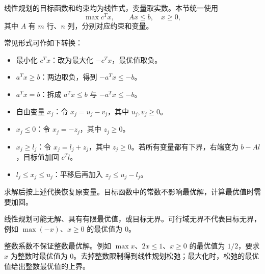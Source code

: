 线性规划的目标函数和约束均为线性式，变量取实数。本节统一使用
\[
\max c^Tx,\qquad Ax\le b,\quad x\ge0,
\]
其中 $A$ 有 $m$ 行、$n$ 列，分别对应约束和变量。

常见形式可作如下转换：
\begin{itemize}[leftmargin=*,nosep]
\item 最小化 $c^Tx$：改为最大化 $-c^Tx$，最优值取负。
\item $a^Tx\ge b$：两边取负，得到 $-a^Tx\le-b$。
\item $a^Tx=b$：拆成 $a^Tx\le b$ 与 $-a^Tx\le-b$。
\item 自由变量 $x_j$：令 $x_j=u_j-v_j$，其中 $u_j,v_j\ge0$。
\item $x_j\le0$：令 $x_j=-z_j$，其中 $z_j\ge0$。
\item $x_j\ge l_j$：令 $x_j=l_j+z_j$，其中 $z_j\ge0$。若所有变量都有下界，右端变为 $b-Al$，目标值加回 $c^Tl$。
\item $l_j\le x_j\le u_j$：平移后再加入 $z_j\le u_j-l_j$。
\end{itemize}
求解后按上述代换恢复原变量。目标函数中的常数不影响最优解，计算最优值时需要加回。

线性规划可能无解、具有有限最优值，或目标无界。可行域无界不代表目标无界，例如 $\max(-x)$、$x\ge0$ 的最优值为 $0$。

整数系数不保证整数最优解。例如 $\max x$、$2x\le1$、$x\ge0$ 的最优值为 $1/2$，要求 $x$ 为整数时最优值为 $0$。去掉整数限制得到线性规划松弛；最大化时，松弛的最优值给出整数最优值的上界。
